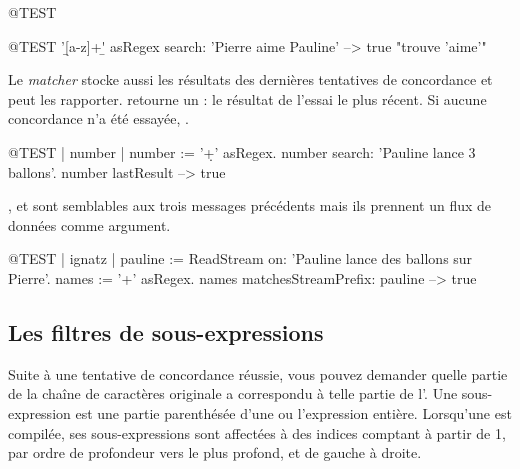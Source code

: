 \documentclass[a4paper,10pt,twoside]{book}
\begin{document}
\begin{code}{@TEST}
\begin{code}{@TEST}
'\b[a-z]+\b' asRegex search: 'Pierre aime Pauline' --> true    "trouve 'aime'"
\end{code}

Le \emph{matcher} stocke aussi les résultats des dernières tentatives
de concordance et peut les rapporter.
 retourne un : le résultat
de l'essai le plus récent. Si aucune concordance n'a été essayée, .

\begin{code}{@TEST | number |}
number := '\d+' asRegex.
number search: 'Pauline lance 3 ballons'.
number lastResult --> true
\end{code}

,
 et
 sont semblables aux trois messages
précédents mais ils prennent un flux de données comme argument.

\begin{code}{@TEST | ignatz |}
pauline := ReadStream on: 'Pauline lance des ballons sur Pierre'.
names := '\<[A-Z][a-z]+\>' asRegex.
names matchesStreamPrefix: pauline --> true
\end{code}

\subsection{Les filtres de sous-expressions}

Suite à une tentative de concordance réussie, vous pouvez demander
quelle partie de la chaîne de caractères originale a correspondu à
telle partie de l'\expreg. Une sous-expression est une partie
parenthésée d'une \expreg ou l'expression entière.
Lorsqu'une \expreg est compilée, ses sous-expressions sont affectées à
des indices comptant à partir de 1, par ordre de profondeur
  vers le plus profond, et de gauche à droite. 


\end{code}
\end{document}
